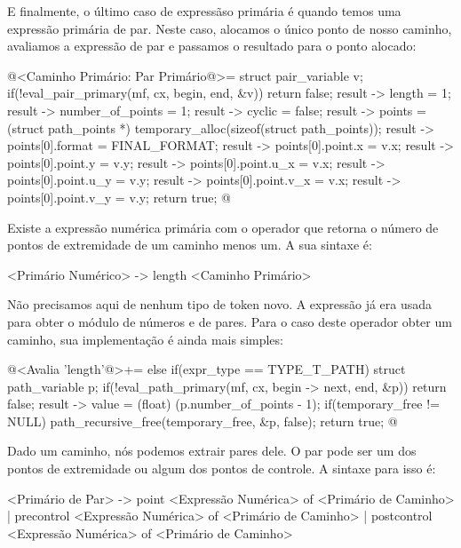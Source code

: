 {{{{{{E finalmente, o último caso de expressãso primária é quando temos uma
expressão primária de par. Neste caso, alocamos o único ponto de nosso
caminho, avaliamos a expressão de par e passamos o resultado para o
ponto alocado:

\iniciocodigo
@<Caminho Primário: Par Primário@>=
struct pair_variable v;
if(!eval_pair_primary(mf, cx, begin, end, &v))
  return false;
result -> length = 1;
result -> number_of_points = 1;
result -> cyclic = false;
result -> points = (struct path_points *)
                     temporary_alloc(sizeof(struct path_points));
result -> points[0].format = FINAL_FORMAT;
result -> points[0].point.x = v.x;
result -> points[0].point.y = v.y;
result -> points[0].point.u_x = v.x;
result -> points[0].point.u_y = v.y;
result -> points[0].point.v_x = v.x;
result -> points[0].point.v_y = v.y;
return true;
@
\fimcodigo


Existe a expressão numérica primária com o
operador  que retorna o número de pontos de
extremidade de um caminho menos um. A sua sintaxe é:

\alinhaverbatim
<Primário Numérico> -> length <Caminho Primário>
\alinhanormal

Não precisamos aqui de nenhum tipo de token novo. A
expressão  já era usada para obter o módulo de
números e de pares. Para o caso deste operador obter um caminho, sua
implementação é ainda mais simples:

\iniciocodigo
@<Avalia 'length'@>+=
else if(expr_type == TYPE_T_PATH){
  struct path_variable p;
  if(!eval_path_primary(mf, cx, begin -> next, end, &p))
    return false;
  result -> value = (float) (p.number_of_points - 1);
  if(temporary_free != NULL)
    path_recursive_free(temporary_free, &p, false);
  return true;
}
@
\fimcodigo


Dado um caminho, nós podemos extrair pares dele. O par pode ser um dos
pontos de extremidade ou algum dos pontos de controle. A sintaxe para
isso é:

\alinhaverbatim
<Primário de Par> -> point <Expressão Numérica> of <Primário de Caminho> |
                     precontrol <Expressão Numérica> of <Primário de Caminho> |
                     postcontrol <Expressão Numérica> of <Primário de Caminho>
\alinhanormal

}}}}}}
